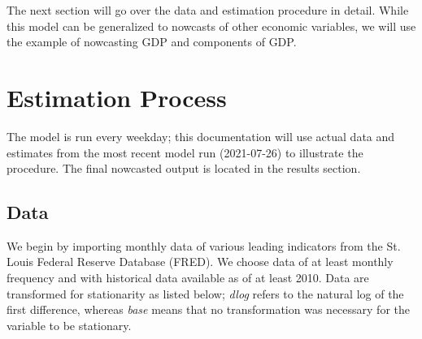 \documentclass[11pt, letterpaper]{article}\usepackage[]{graphicx}\usepackage[]{color}
\begin{document}
The next section will go over the data and estimation procedure in detail. While this model can be generalized to nowcasts of other economic variables, we will use the example of nowcasting GDP and components of GDP.

\newpage
\section{Estimation Process}
The model is run every weekday; this documentation will use actual data and estimates from the most recent model run (2021-07-26) to illustrate the procedure. The final nowcasted output is located in the results section.

\subsection{Data}
We begin by importing monthly data of various leading indicators from the St. Louis Federal Reserve Database (FRED). We choose data of at least monthly frequency and with historical data available as of at least 2010. Data are transformed for stationarity as listed below; \textit{dlog} refers to the natural log of the first difference, whereas \textit{base} means that no transformation was necessary for the variable to be stationary.
\end{document}
